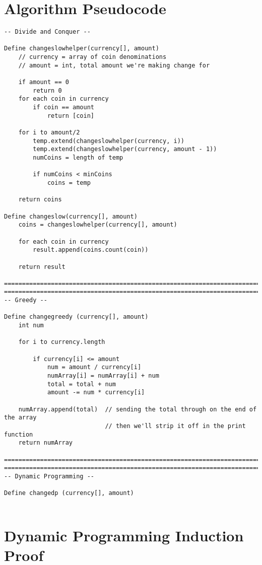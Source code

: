 \documentclass[11pt,letterpaper]{article}
\begin{document}
\section*{Algorithm Pseudocode}
\begin{verbatim}
-- Divide and Conquer --

Define changeslowhelper(currency[], amount)
    // currency = array of coin denominations
    // amount = int, total amount we're making change for
    
    if amount == 0
        return 0
    for each coin in currency
        if coin == amount
            return [coin]
			
    for i to amount/2
        temp.extend(changeslowhelper(currency, i))
        temp.extend(changeslowhelper(currency, amount - 1))
        numCoins = length of temp
		
        if numCoins < minCoins
            coins = temp
	
    return coins
	
Define changeslow(currency[], amount)
    coins = changeslowhelper(currency[], amount)
	
    for each coin in currency
        result.append(coins.count(coin))
	
    return result
	
===================================================================================
===================================================================================
-- Greedy --

Define changegreedy (currency[], amount)
    int num
	
    for i to currency.length
		
        if currency[i] <= amount
            num = amount / currency[i]
            numArray[i] = numArray[i] + num
            total = total + num
            amount -= num * currency[i]
	
    numArray.append(total)  // sending the total through on the end of the array
                            // then we'll strip it off in the print function
    return numArray
    
===================================================================================
===================================================================================
-- Dynamic Programming --

Define changedp (currency[], amount)


\end{verbatim}

\section*{Dynamic Programming Induction Proof}
\end{document}
